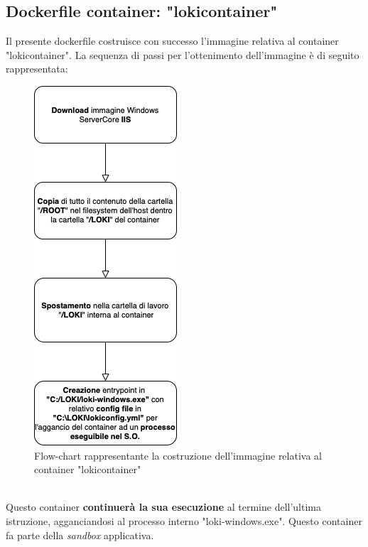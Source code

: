 \subsection{Dockerfile container: "lokicontainer"}
Il presente dockerfile costruisce con successo l'immagine relativa al container "lokicontainer". La sequenza di passi per l'ottenimento dell'immagine è di seguito rappresentata:
\begin{figure}[!h]     
\centering 
    \includegraphics[width=0.3\columnwidth]{immagini/flowchart/flowchart_lokicontainer} 
    \caption{Flow-chart rappresentante la costruzione dell'immagine relativa al container "lokicontainer"}
\end{figure} \\
Questo container \textbf{ continuerà la sua esecuzione} al termine dell'ultima istruzione, agganciandosi al processo interno "loki-windows.exe". Questo container fa parte della \textit{sandbox} applicativa.
\newpage

